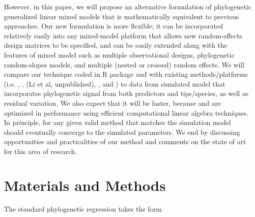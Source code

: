 \documentclass[12pt]{article}
\begin{document}
However, in this paper, we will propose an alternative formulation of phylogenetic generalized linear mixed models that is mathematically equivalent to previous approaches.
Our new formulation is more flexible; it can be incorporated relatively easily into any mixed-model platform that allows new random-effects design matrices to be specified, and can be easily extended along with the features of mixed model such as multiple observational designs, phylogenetic random-slopes models, and multiple (nested or crossed) random effects.
We will compare our technique coded in R package  and  with existing methods/platforms (i.e.  \citep{pinheiro2014r},  \citep{ho2014phylolm},  \citep{pearse2015pez}  (Li et al, unpublished),  \citep{hadfield2010mcmc}, and  \citep{burkner2016brms}) to data from simulated model that incorporates phylogenetic signal from both predictors and tips/species, as well as residual variation.
We also expect that it will be faster, because  and  are optimized in performance using efficient computational linear algebra techniques. 
In principle, for any given valid method that matches the simulation model should eventually converge to the simulated parameters. 
We end by discussing opportunities and practicalities of our method and comments on the state of art for this area of research. 

\section{Materials and Methods}

\newcommand{\bX}{{\mathbf X}}
\newcommand{\bbeta}{{\boldsymbol \beta}}
\newcommand{\bmu}{{\boldsymbol \mu}}
\newcommand{\bY}{{\mathbf Y}}
\newcommand{\bC}{{\mathbf C}}
\newcommand{\bZ}{{\mathbf Z}}
\newcommand{\bb}{{\mathbf b}}
\newcommand{\be}{{\mathbf e}}
\newcommand{\bSigma}{{\boldsymbol \Sigma}}

The standard phylogenetic regression takes the form 

\end{document}
